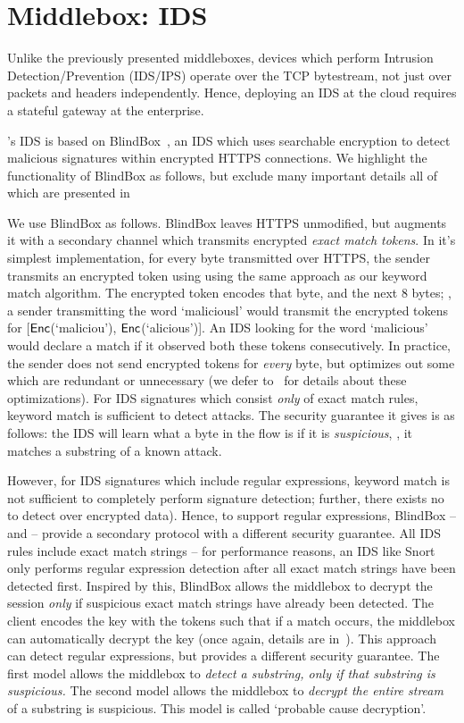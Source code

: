 


\section{Middlebox: IDS}\label{sec:ids}
Unlike the previously presented middleboxes, devices which perform Intrusion Detection/Prevention (IDS/IPS) operate over the TCP bytestream, not just over packets and headers independently.
Hence, deploying an IDS at the cloud requires a stateful gateway at the enterprise.

\sys's IDS is based on BlindBox~\cite{blindbox}, an IDS which uses searchable encryption to detect malicious signatures within encrypted HTTPS connections. We highlight the functionality of BlindBox as follows, but exclude many important details all of which are presented in~\cite{blindbox}

We use BlindBox as follows.
BlindBox leaves HTTPS unmodified, but augments it with a secondary channel which transmits encrypted {\it exact match tokens}.
In it's simplest implementation, for every byte transmitted over HTTPS, the sender transmits an encrypted token using using the same approach as our keyword match algorithm.
The encrypted token encodes that byte, and the next 8 bytes; \eg{}, a sender transmitting the word `maliciousl' would transmit the encrypted tokens for [$\mathsf{Enc}$(`maliciou'), $\mathsf{Enc}$(`alicious')].
An IDS looking for the word `malicious' would declare a match if it observed both these tokens consecutively.
In practice, the sender does not send encrypted tokens for {\it every} byte, but optimizes out some which are redundant or unnecessary (we defer to~\cite{blindbox} for details about these optimizations).
For IDS signatures which consist {\it only} of exact match rules, keyword match is sufficient to detect attacks.
The security guarantee it gives is as follows: the IDS will learn what a byte in the flow is if it is {\it suspicious}, \ie{}, it matches a substring of a known attack.

  However, for IDS signatures which include regular expressions, keyword match is not sufficient to completely perform signature detection; further, there exists no  to detect over encrypted data).
  Hence, to support regular expressions, BlindBox -- and \sys -- provide a secondary protocol with a different security guarantee. 
  All IDS rules include exact match strings -- for performance reasons, an IDS like Snort~\cite{Snort} only performs regular expression detection after all exact match strings have been detected first.
  Inspired by this, BlindBox allows the middlebox to decrypt the session {\it only} if suspicious exact match strings have already been detected.
  The client encodes the key with the tokens such that if a match occurs, the middlebox can automatically decrypt the key (once again, details are in~\cite{blindbox}).
  This approach can detect regular expressions, but provides a different security guarantee. 
  The first model allows the middlebox to {\it detect a substring, only if that substring is suspicious.} 
  The second model allows the middlebox to {\it decrypt the entire stream} of a substring is suspicious.
  This model is called `probable cause decryption'.

